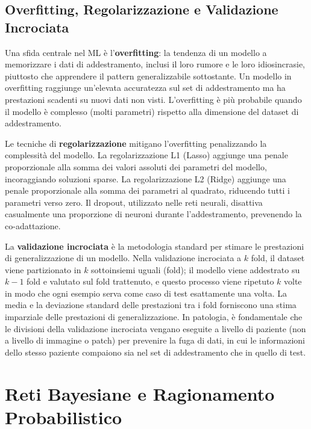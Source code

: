 \subsection{Overfitting, Regolarizzazione e Validazione Incrociata}

Una sfida centrale nel ML è l'\textbf{overfitting}: la tendenza di un modello a memorizzare i dati di addestramento, inclusi il loro rumore e le loro idiosincrasie, piuttosto che apprendere il pattern generalizzabile sottostante. Un modello in overfitting raggiunge un'elevata accuratezza sul set di addestramento ma ha prestazioni scadenti su nuovi dati non visti. L'overfitting è più probabile quando il modello è complesso (molti parametri) rispetto alla dimensione del dataset di addestramento.

Le tecniche di \textbf{regolarizzazione} mitigano l'overfitting penalizzando la complessità del modello. La regolarizzazione L1 (Lasso) aggiunge una penale proporzionale alla somma dei valori assoluti dei parametri del modello, incoraggiando soluzioni sparse. La regolarizzazione L2 (Ridge) aggiunge una penale proporzionale alla somma dei parametri al quadrato, riducendo tutti i parametri verso zero. Il dropout, utilizzato nelle reti neurali, disattiva casualmente una proporzione di neuroni durante l'addestramento, prevenendo la co-adattazione.

La \textbf{validazione incrociata} è la metodologia standard per stimare le prestazioni di generalizzazione di un modello. Nella validazione incrociata a $k$ fold, il dataset viene partizionato in $k$ sottoinsiemi uguali (fold); il modello viene addestrato su $k-1$ fold e valutato sul fold trattenuto, e questo processo viene ripetuto $k$ volte in modo che ogni esempio serva come caso di test esattamente una volta. La media e la deviazione standard delle prestazioni tra i fold forniscono una stima imparziale delle prestazioni di generalizzazione. In patologia, è fondamentale che le divisioni della validazione incrociata vengano eseguite a livello di paziente (non a livello di immagine o patch) per prevenire la fuga di dati, in cui le informazioni dello stesso paziente compaiono sia nel set di addestramento che in quello di test.

\section{Reti Bayesiane e Ragionamento Probabilistico}
\label{sec:ch3_bayesian}

